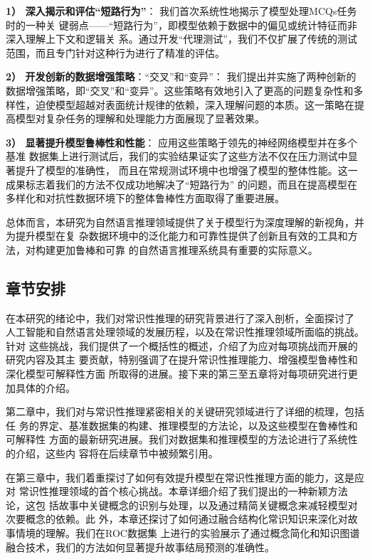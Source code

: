 \textbf{1） 深入揭示和评估``短路行为''}： 我们首次系统性地揭示了模型处理MCQs任务时的一种关
键弱点——``短路行为''，即模型依赖于数据中的偏见或统计特征而非深入理解上下文和逻辑关
系。通过开发``代理测试''，我们不仅扩展了传统的测试范围，而且专门针对这种行为进行了精准的评估。

\textbf{2） 开发创新的数据增强策略}：``交叉''和``变异''： 我们提出并实施了两种创新的数据增强策略，即``交叉''和``变异''。这些策略有效地引入了更高的问题复杂性和多样性，迫使模型超越对表面统计规律的依赖，深入理解问题的本质。这一策略在提高模型对复杂任务的理解和处理能力方面展现了显著效果。

\textbf{3） 显著提升模型鲁棒性和性能}： 应用这些策略于领先的神经网络模型并在多个基准
数据集上进行测试后，我们的实验结果证实了这些方法不仅在压力测试中显著提升了模型的准确性，
而且在常规测试环境中也增强了模型的整体性能。这一成果标志着我们的方法不仅成功地解决了``短路行为''
的问题，而且在提高模型在多样化和对抗性数据环境下的整体鲁棒性方面取得了重要进展。

总体而言，本研究为自然语言推理领域提供了关于模型行为深度理解的新视角，并为提升模型在复
杂数据环境中的泛化能力和可靠性提供了创新且有效的工具和方法，对构建更加鲁棒和可靠
的自然语言推理系统具有重要的实际意义。


\subsection{章节安排}

在本研究的绪论中，我们对常识性推理的研究背景进行了深入剖析，全面探讨了
人工智能和自然语言处理领域的发展历程，以及在常识性推理领域所面临的挑战。针对
这些挑战，我们提供了一个概括性的概述，介绍了为应对每项挑战而开展的研究内容及其主
要贡献，特别强调了在提升常识性推理能力、增强模型鲁棒性和深化模型可解释性方面
所取得的进展。接下来的第三至五章将对每项研究进行更加具体的介绍。

第二章中，我们对与常识性推理紧密相关的关键研究领域进行了详细的梳理，包括任
务的界定、基准数据集的构建、推理模型的方法论，以及这些模型在鲁棒性和可解释性
方面的最新研究进展。我们对数据集和推理模型的方法论进行了系统性的介绍，这些内
容将在后续章节中被频繁引用。

在第三章中，我们着重探讨了如何有效提升模型在常识性推理方面的能力，这是应对
常识性推理领域的首个核心挑战。本章详细介绍了我们提出的一种新颖方法论，这包
括故事中关键概念的识别与处理，以及通过精简关键概念来减轻模型对次要概念的依赖。此
外，本章还探讨了如何通过融合结构化常识知识来深化对故事情境的理解。我们在ROC数据集
上进行的实验展示了通过概念简化和知识图谱融合技术，我们的方法如何显著提升故事结局预测的准确性。

